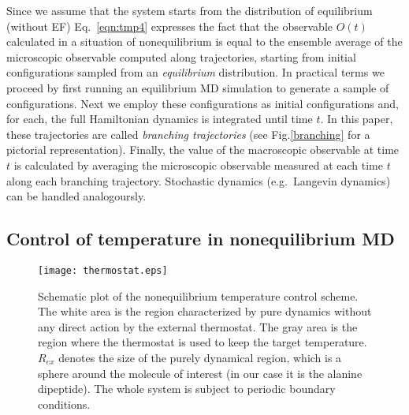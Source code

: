 \documentclass[a4paper,preprint,unsortedaddress,onecolumn]{revtex4-1}
\newcommand{\vect}[1]{\textbf{\textit{#1}}}
\begin{document}
Since we assume that the system starts from the distribution of equilibrium (without EF)
 Eq.~\eqref{eqn:tmp4} expresses the fact that the 
observable $O(t)$ calculated in a situation of nonequilibrium is equal to the ensemble average of
the microscopic observable computed along trajectories, starting from
initial configurations sampled from an \emph{equilibrium}
distribution. In practical terms we proceed by first running an equilibrium MD simulation
to generate a sample of configurations. Next we employ these configurations as
initial configurations and, for each, the full Hamiltonian dynamics is integrated until
time $t$.
In this paper, these trajectories are called \emph{branching
  trajectories} (see Fig.\ref{branching} for a pictorial representation). 
Finally, the value of the macroscopic observable at time $t$ is
calculated by averaging the microscopic observable measured at each time $t$ along each branching trajectory.
Stochastic dynamics (e.g.~Langevin dynamics) can be handled analogoursly.



\subsection{Control of temperature in nonequilibrium MD}\label{sec:tmp2b}


\begin{figure}
  \centering
  \texttt{[image: thermostat.eps]}
  \caption{Schematic plot of the nonequilibrium temperature control scheme.
    The white area is the region characterized by pure dynamics without any direct action by the external thermostat.
    The gray area is the region where the thermostat is used to keep the target temperature.
    $R_{ex}$ denotes the size of the purely dynamical region, which
    is a sphere around the molecule of interest (in our case it is the alanine
    dipeptide).
    The whole system is subject to periodic boundary conditions. }
  \label{fig:tmp2}
\end{figure}
\end{document}
